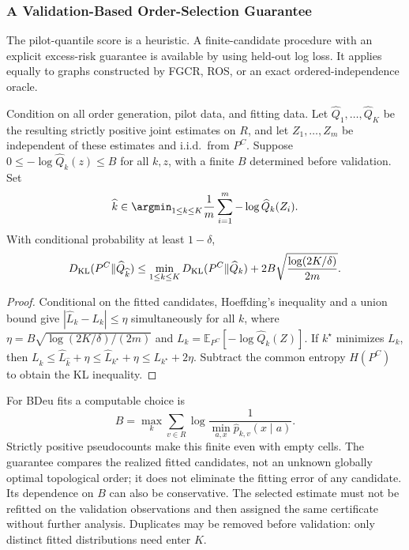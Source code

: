 \subsubsection{A Validation-Based Order-Selection Guarantee}
\label{subsubsec:validated-order}
The pilot-quantile score is a heuristic. A finite-candidate procedure with
an explicit excess-risk guarantee is available by using held-out log loss.
It applies equally to graphs constructed by FGCR, ROS, or an exact
ordered-independence oracle.

\begin{theorem}
\label{thm:validation-selection}
Condition on all order generation, pilot data, and fitting data.
Let $\widehat Q_1,\ldots,\widehat Q_K$ be the resulting strictly positive
joint estimates on $R$, and let $Z_1,\ldots,Z_m$ be independent of these
estimates and i.i.d.\ from $P^C$. Suppose
$0\leq-\log\widehat Q_k(z)\leq B$ for all $k,z$, with a finite
$B$ determined before validation. Set
\[
\widehat k\in\argmin_{1\leq k\leq K}
\frac1m\sum_{i=1}^m-\log\widehat Q_k(Z_i).
\]
With conditional probability at least $1-\delta$,
\begin{equation}
D_{\rm KL}(P^C\Vert\widehat Q_{\widehat k})
\leq \min_{1\leq k\leq K}D_{\rm KL}(P^C\Vert\widehat Q_k)
 +2B\sqrt{\frac{\log(2K/\delta)}{2m}}.
\label{eq:selection-oracle}
\end{equation}
\end{theorem}
\begin{proof}
Conditional on the fitted candidates, Hoeffding's inequality and a union
bound give $|\widehat L_k-L_k|\leq\eta$ simultaneously for all $k$,
where $\eta=B\sqrt{\log(2K/\delta)/(2m)}$ and
$L_k=\mathbb E_{P^C}[-\log\widehat Q_k(Z)]$.
If $k^\star$ minimizes $L_k$, then
$L_{\widehat k}\leq\widehat L_{\widehat k}+\eta
\leq\widehat L_{k^\star}+\eta\leq L_{k^\star}+2\eta$.
Subtract the common entropy $H(P^C)$ to obtain the KL inequality.
\end{proof}

For BDeu fits a computable choice is
\[
B=\max_k\sum_{v\in R}
\log\frac{1}{\min_{a,x}\widehat p_{k,v}(x\mid a)}.
\]
Strictly positive pseudocounts make this finite even with empty cells.
The guarantee compares the realized fitted candidates, not an unknown
globally optimal topological order; it does not eliminate the fitting
error of any candidate. Its dependence on $B$ can also be conservative.
The selected estimate must not be refitted on the validation observations
and then assigned the same certificate without further analysis.
Duplicates may be removed before validation: only distinct fitted
distributions need enter $K$.

